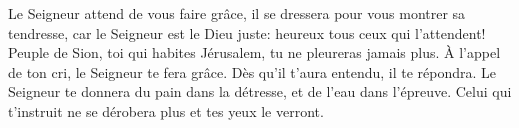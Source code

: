 Le Seigneur attend de vous faire grâce,
	il se dressera pour vous montrer sa tendresse,
	car le Seigneur est le Dieu juste:
	heureux tous ceux qui l’attendent!
Peuple de Sion, toi qui habites Jérusalem, tu ne pleureras jamais plus.
	À l’appel de ton cri, le Seigneur te fera grâce.
	Dès qu’il t’aura entendu, il te répondra.
Le Seigneur te donnera du pain dans la détresse,
	et de l’eau dans l’épreuve.
	Celui qui t’instruit ne se dérobera plus et tes yeux le verront.
